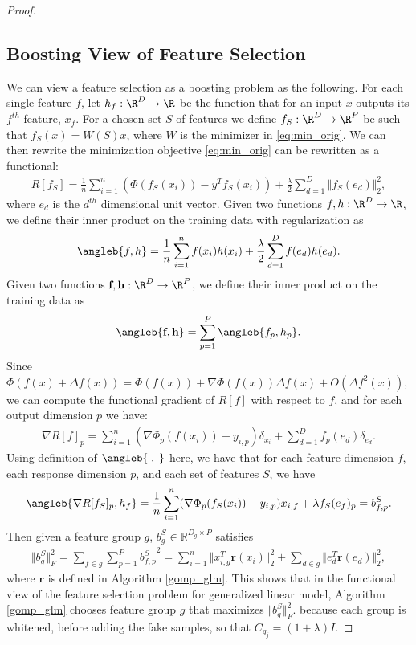\begin{proof}
\subsection{Boosting View of Feature Selection}
We can view a feature selection as a boosting problem as the following. 
For each single feature $f$, let $h_f : \R^D \rightarrow \R$ be the function that for 
an input $x$ outputs its $f^{th}$ feature, $x_f$. 
For a chosen set $S$ of features we 
define $f_S: \R^D \rightarrow \R^P$ be such that 
$f_S(x) = W(S)x$, where $W$ is the minimizer in \ref{eq:min_orig}. 
We can then rewrite the minimization objective \ref{eq:min_orig}
can be rewritten as a functional:
\begin{align}
  R[f_S] = \frac{1}{n} \sum _{i=1}^n (\Phi(f_S(x_i)) - y^Tf_S(x_i)) 
    + \frac{\lambda}{2} \sum _{d = 1}^D \Vert f_S(e_d) \Vert _2^2,
  \label{min_func}
\end{align}
where $e_d$ is the $d^{th}$ dimensional unit vector.
Given two functions $f, h : \R^D \rightarrow \R$, we define their inner product 
on the training data with regularization as 
\begin{align}
\angleb{f, h} = \frac{1}{n} 
  \sum _{i=1}^n f(x_i)h(x_i) + \frac{\lambda}{2} \sum _{d=1}^D f(e_d)h(e_d).
\end{align}
Given two functions $\textbf{f}, \textbf{h}: \R^D \rightarrow \R^P$, 
we define their inner product on the training data as 
\begin{align}
  \angleb{\textbf{f}, \textbf{h}} = \sum _{p=1}^P \angleb{f_p, h_p}.
\end{align}
Since $\Phi(f(x) + \Delta f(x)) = \Phi(f(x)) + \nabla\Phi(f(x))\Delta f(x) + 
O(\Delta f^2(x))$,
we can compute the functional gradient of $R[f]$
with respect to $f$, and for each output dimension $p$ we have:
\begin{align}
  \nabla R[f]_p = \sum_{i=1}^n (\nabla\Phi_p(f(x_i)) - y_{i,p})\delta_{x_i} 
    + \sum _{d=1}^D f_p(e_d)\delta_{e_d}.
\end{align}
Using definition of $\angleb{\;,\;}$ here, we have that
for each feature dimension $f$, each response dimension $p$, 
  and each set of features $S$, we have  
\begin{align}
  \angleb{\nabla R[f_S]_p , h_f} = 
    \frac{1}{n}\sum_{i=1}^n (\nabla\Phi_p(f_S(x_i)) - y_{i,p})x_{i,f}
    + \lambda f_S(e_f)_p = b_{f,p}^S. 
\end{align}
Then given a feature group $g$, $b_{g}^S \in \mathbb{R}^{D_g \times P}$ satisfies 
\begin{align}
  \Vert b_{g}^S \Vert _F^2 = \sum _{f \in g} \sum _{p=1}^P {b_{f,p}^S}^2 = 
    \sum _{i=1}^n \Vert x_{i,g}^T\textbf{r}(x_{i}) \Vert _2^2  + \sum _{d \in g} \Vert e_d^T\textbf{r}(e_d) \Vert _2^2,
\end{align} where
$\textbf{r}$ is defined in Algorithm \ref{gomp_glm}. This shows that in the functional view of the 
feature selection problem for generalized linear model, Algorithm \ref{gomp_glm} chooses
feature group $g$ that maximizes $\Vert b_{g}^S \Vert _F^2$. because each group is whitened, before adding the fake samples,
 so that $C_{g_j} = ( 1 + \lambda) I$.
\end{proof}

